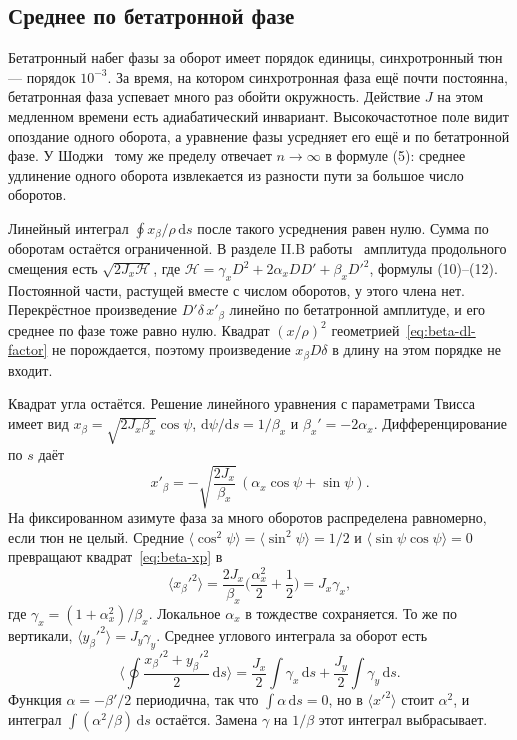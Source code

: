\documentclass[aps,pra,preprint,a4paper,amsmath,amssymb,longbibliography]{revtex4-2}
\begin{document}
\subsection{Среднее по бетатронной фазе}
\label{sec:ch2-avg}

Бетатронный набег фазы за оборот имеет порядок единицы, синхротронный тюн --- порядок $10^{-3}$. За время, на котором синхротронная фаза ещё почти постоянна, бетатронная фаза успевает много раз обойти окружность. Действие $J$ на этом медленном времени есть адиабатический инвариант. Высокочастотное поле видит опоздание одного оборота, а уравнение фазы усредняет его ещё и по бетатронной фазе. У Шоджи~\cite{Shoji2005} тому же пределу отвечает $n\to\infty$ в формуле (5): среднее удлинение одного оборота извлекается из разности пути за большое число оборотов.

Линейный интеграл $\oint x_\beta/\rho\,\mathrm{d}s$ после такого усреднения равен нулю. Сумма по оборотам остаётся ограниченной. В разделе II.B работы~\cite{Shoji2005} амплитуда продольного смещения есть $\sqrt{2J_x\mathcal{H}}$, где $\mathcal{H}=\gamma_x D^2+2\alpha_x DD'+\beta_x D'^2$, формулы (10)--(12). Постоянной части, растущей вместе с числом оборотов, у этого члена нет. Перекрёстное произведение $D'\delta\,x'_\beta$ линейно по бетатронной амплитуде, и его среднее по фазе тоже равно нулю. Квадрат $(x/\rho)^2$ геометрией~\eqref{eq:beta-dl-factor} не порождается, поэтому произведение $x_\beta D\delta$ в длину на этом порядке не входит.

Квадрат угла остаётся. Решение линейного уравнения с параметрами Твисса имеет вид $x_\beta=\sqrt{2J_x\beta_x}\cos\psi$, $\mathrm{d}\psi/\mathrm{d}s=1/\beta_x$ и $\beta_x'=-2\alpha_x$. Дифференцирование по $s$ даёт
\begin{equation}
\label{eq:beta-xp}
x'_\beta
=-\sqrt{\frac{2J_x}{\beta_x}}\,(\alpha_x\cos\psi+\sin\psi).
\end{equation}
На фиксированном азимуте фаза за много оборотов распределена равномерно, если тюн не целый. Средние $\langle\cos^2\psi\rangle=\langle\sin^2\psi\rangle=1/2$ и $\langle\sin\psi\cos\psi\rangle=0$ превращают квадрат~\eqref{eq:beta-xp} в
\begin{equation}
\label{eq:beta-xp2}
\langle x_\beta'^2\rangle
=\frac{2J_x}{\beta_x}\Biggl(\frac{\alpha_x^2}{2}+\frac{1}{2}\Biggr)
=J_x\gamma_x,
\end{equation}
где $\gamma_x=(1+\alpha_x^2)/\beta_x$. Локальное $\alpha_x$ в тождестве сохраняется. То же по вертикали, $\langle y_\beta'^2\rangle=J_y\gamma_y$. Среднее углового интеграла за оборот есть
\begin{equation}
\label{eq:beta-angle}
\Biggl\langle\oint\frac{x_\beta'^2+y_\beta'^2}{2}\,\mathrm{d}s\Biggr\rangle
=\frac{J_x}{2}\int\gamma_x\,\mathrm{d}s
+\frac{J_y}{2}\int\gamma_y\,\mathrm{d}s.
\end{equation}
Функция $\alpha=-\beta'/2$ периодична, так что $\int\alpha\,\mathrm{d}s=0$, но в $\langle x'^2\rangle$ стоит $\alpha^2$, и интеграл $\int(\alpha^2/\beta)\,\mathrm{d}s$ остаётся. Замена $\gamma$ на $1/\beta$ этот интеграл выбрасывает.
\end{document}
